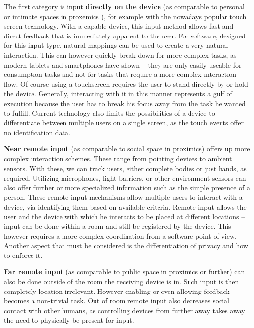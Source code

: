The first category is input \textbf{directly on the device} (as comparable to personal or intimate spaces in proxemics \cite{ballendat_proxemic_2010}), for example with the nowadays popular touch screen technology.
With a capable device, this input method allows fast and direct feedback that is immediately apparent to the user.
For software, designed for this input type, natural mappings can be used to create a very natural interaction.
This can however quickly break down for more complex tasks, as modern tablets and smartphones have shown – they are only easily useable for consumption tasks and not for tasks that require a more complex interaction flow.
Of course using a touchscreen requires the user to stand directly by or hold the device.
Generally, interacting with it in this manner represents a gulf of execution because the user has to break his focus away from the task he wanted to fulfill.
Current technology also limits the possibilities of a device to differentiate between multiple users on a single screen, as the touch events offer no identification data.

\textbf{Near remote input} (as comparable to social space in proximics\cite{ballendat_proxemic_2010}) offers up more complex interaction schemes.
These range from pointing devices to ambient sensors.
With these, we can track users, either complete bodies or just hands, as required. Utilizing microphones, light barriers, or other environment sensors can also offer further or more specialized information such as the simple presence of a person.
These remote input mechanisms allow multiple users to interact with a device, via identifying them based on available criteria.
Remote input allows the user and the device with which he interacts to be placed at different locations – input can be done within a room and still be registered by the device.
This however requires a more complex coordination from a software point of view.
Another aspect that must be considered is the differentiation of privacy and how to enforce it.

\textbf{Far remote input} (as comparable to public space in proximics\cite{ballendat_proxemic_2010} or further) can also be done outside of the room the receiving device is in.
Such input is then completely location irrelevant.
However enabling or even allowing feedback becomes a non-trivial task.
Out of room remote input also decreases social contact with other humans, as controlling devices from further away takes away the need to physically be present for input.

